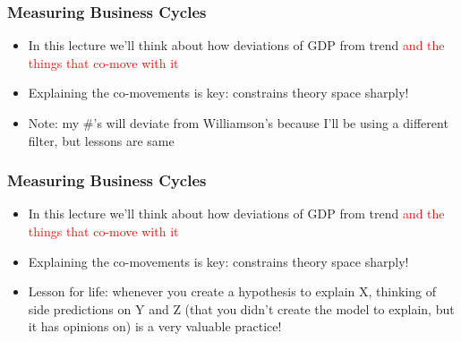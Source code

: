 \documentclass{beamer}
\author{Trevor S. Gallen}
\date{}
\begin{document}
\renewcommand*{\inserttotalframenumber}{\pageref{lastframe}}



\begin{frame}
\titlepage
\end{frame}

\begin{frame}
\frametitle[alignment=center]{Measuring Business Cycles}
\begin{itemize}
\item In this lecture we'll think about how deviations of GDP from trend \textcolor{red}{and the things that co-move with it}
\bigskip
\item Explaining the co-movements is key: constrains theory space sharply!
\bigskip
\item Note:  my \#'s will deviate from Williamson's because I'll be using a different filter, but lessons are same
\end{itemize}
\end{frame}


\begin{frame}
\frametitle[alignment=center]{Measuring Business Cycles}
\begin{itemize}
\item In this lecture we'll think about how deviations of GDP from trend \textcolor{red}{and the things that co-move with it}
\bigskip
\item Explaining the co-movements is key: constrains theory space sharply!
\bigskip
\item Lesson for life:  whenever you create a hypothesis to explain X, thinking of side predictions on Y and Z (that you didn't create the model to explain, but it has opinions on) is a very valuable practice!
\end{itemize}
\end{frame}
\end{document}
